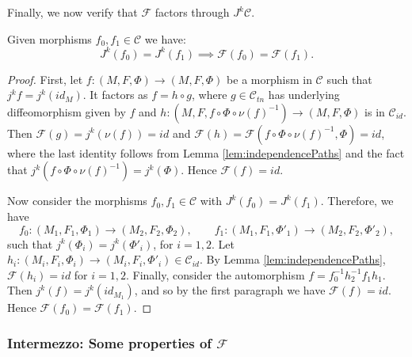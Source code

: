 \documentclass[10pt]{amsart}
\newcommand{\F}{{\mathcal{F}}}
\newcommand{\C}{\mathcal{C}}
\numberwithin{theoremalpha}{section}
\numberwithin{equation}{section}
\numberwithin{definition}{section}
\numberwithin{theorem}{section}
\numberwithin{proposition}{section}
\numberwithin{lemma}{section}
\numberwithin{example}{section}
\numberwithin{remark}{section}
\numberwithin{corollary}{section}
\numberwithin{question}{section}
\numberwithin{problem}{section}
\numberwithin{assumption}{section}
\theoremstyle{named}
\numberwithin{equation}{section}
\begin{document}
Finally, we now verify that $\F$ factors through $J^k\C$.
\begin{proposition}
Given morphisms $f_0,f_1 \in \C$ we have:
\begin{equation*}
J^k(f_0) = J^k(f_1) \implies \F(f_0) = \F(f_1).
\end{equation*}
\end{proposition}
\begin{proof}
First, let $f : (M, F, \Phi) \to (M, F, \Phi)$ be a morphism in $\C$ such that $j^kf = j^k(id_M)$. It factors as $f = h \circ g$, where $g \in \C_{tn}$ has underlying diffeomorphism given by $f$ and $h : (M, F, f \circ \Phi \circ \nu(f)^{-1}) \to (M, F, \Phi)$ is in $\C_{id}$. Then $\F(g) = j^k(\nu(f)) = id$ and $\F(h) = \F(f \circ \Phi \circ \nu(f)^{-1}, \Phi) = id$, where the last identity follows from Lemma \ref{lem:independencePaths} and the fact that $j^k(f \circ \Phi \circ \nu(f)^{-1}) = j^k(\Phi)$. Hence $\F(f) = id$. 

Now consider the morphisms $f_{0}, f_{1} \in \C$ with $J^k(f_0) = J^k(f_1)$. Therefore, we have
\[
f_{0} : (M_{1}, F_{1}, \Phi_{1}) \to (M_{2}, F_{2}, \Phi_{2}), \qquad f_{1} : (M_{1}, F_{1}, \Phi'_{1}) \to (M_{2}, F_{2}, \Phi'_{2}),
\]
such that $j^k(\Phi_{i}) = j^{k}(\Phi'_{i})$, for $i = 1, 2$. Let $h_{i} : (M_{i}, F_{i}, \Phi_{i}) \to (M_{i}, F_{i}, \Phi'_{i}) \in \mathcal{C}_{id}$. By Lemma \ref{lem:independencePaths}, $\mathcal{F}(h_{i}) = id$ for $i = 1, 2$. Finally, consider the automorphism $f = f_0^{-1} h_{2}^{-1} f_{1} h_{1}$. Then $j^k(f) = j^k(id_{M_{1}})$, and so by the first paragraph we have $\F(f) = id$. Hence $\F(f_0) = \F(f_1)$. 
\end{proof}


\subsubsection{Intermezzo: Some properties of $\F$}
\end{document}
